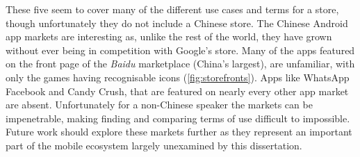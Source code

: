 \documentclass[thesis.tex]{subfiles}
\begin{document}
These five seem to cover many of the different use cases and terms for a store, though unfortunately they do not include a Chinese store.
The Chinese Android app markets are interesting as, unlike the rest of the world, they have grown without ever being in competition with Google's store.
Many of the apps featured on the front page of the \emph{Baidu} marketplace (China's largest), are unfamiliar, with only the games having recognisable icons (\autoref{fig:storefronts}).
Apps like WhatsApp Facebook and Candy Crush, that are featured on nearly every other app market are absent.
Unfortunately for a non-Chinese speaker the markets can be impenetrable, making finding and comparing terms of use difficult to impossible.
Future work should explore these markets further as they represent an important part of the mobile ecosystem largely unexamined by this dissertation.
\end{document}

